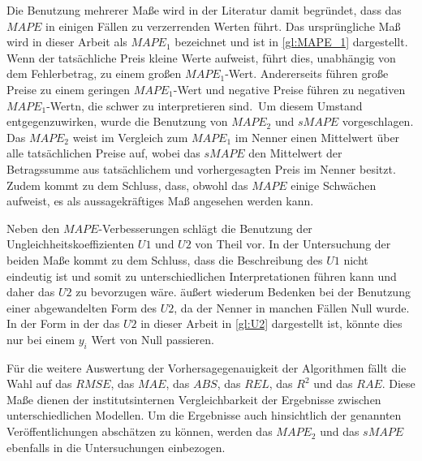 Die Benutzung mehrerer Maße wird in der Literatur damit begründet, dass das $MAPE$ in einigen Fällen zu verzerrenden Werten führt. Das ursprüngliche Maß wird in dieser Arbeit als $MAPE_1$ bezeichnet und ist in \autoref{gl:MAPE_1} dargestellt. Wenn der tatsächliche Preis kleine Werte aufweist, führt dies, unabhängig von dem Fehlerbetrag, zu einem großen $MAPE_1$-Wert. Andererseits führen große Preise zu einem geringen $MAPE_1$-Wert und negative Preise führen zu negativen $MAPE_1$-Wertn, die schwer zu interpretieren sind.\, Um diesem \hbox{Umstand} \hbox{entgegenzuwirken}, wurde die Benutzung von $MAPE_2$ und $sMAPE$ vorgeschlagen. Das $MAPE_2$ weist im Vergleich zum $MAPE_1$ im Nenner einen Mittelwert über alle tatsächlichen Preise auf, wobei das $sMAPE$ den Mittelwert der Betragssumme aus tatsächlichem und vorhergesagten Preis im Nenner besitzt. Zudem kommt \citet{Makridakis1993} zu dem Schluss, dass, obwohl das $MAPE$ einige Schwächen aufweist, es als aussagekräftiges Maß angesehen werden kann.

Neben den $MAPE$-Verbesserungen schlägt \citet{Panapakidis2016} die Benutzung der Ungleichheitskoeffizienten $U1$ und $U2$ von Theil vor. In der Untersuchung der beiden Maße kommt \citet{Bliemel1973} zu dem Schluss, dass die Beschreibung des $U1$ nicht eindeutig ist und somit zu unterschiedlichen Interpretationen führen kann und daher das $U2$ zu bevorzugen wäre. \citet{Makridakis1993} äußert wiederum Bedenken bei der Benutzung einer abgewandelten Form des $U2$, da der Nenner in manchen Fällen Null wurde. In der Form in der das $U2$ in dieser Arbeit in \autoref{gl:U2} dargestellt ist, könnte dies nur bei einem $y_i$ Wert von Null passieren.

Für die weitere Auswertung der Vorhersagegenauigkeit der Algorithmen fällt die Wahl auf das $RMSE$, das $MAE$, das $ABS$, das $REL$, das $R^2$ und das $RAE$. Diese Maße dienen der institutsinternen Vergleichbarkeit der Ergebnisse zwischen unterschiedlichen Modellen. Um die Ergebnisse auch hinsichtlich der genannten Veröffentlichungen abschätzen zu können, werden das $MAPE_2$ und das $sMAPE$ ebenfalls in die Untersuchungen einbezogen.


